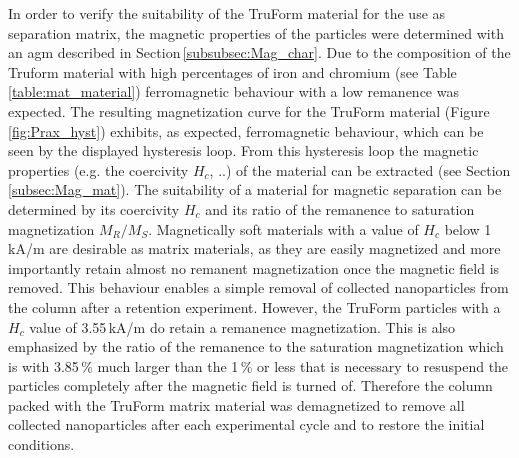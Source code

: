 In order to verify the suitability of the TruForm material for the use as separation matrix, the magnetic properties of the particles were determined with an \gls{agm} described in Section\,\ref{subsubsec:Mag_char}. Due to the composition of the Truform material with high percentages of iron and chromium (see Table\,\ref{table:mat_material}) ferromagnetic behaviour with a low remanence was expected. The resulting magnetization curve for the TruForm material (Figure\,\ref{fig:Prax_hyst}) exhibits, as expected, ferromagnetic behaviour, which can be seen by the displayed hysteresis loop. From this hysteresis loop the magnetic properties (e.g. the coercivity $H_{c}$, ..) of the material can be extracted (see Section \ref{subsec:Mag_mat}). The suitability of a material for magnetic separation can be determined by its coercivity $H_{c}$ and its ratio of the remanence to saturation magnetization $M_{R}/M_{S}$. Magnetically soft materials with a value of $H_{c}$ below 1\,kA/m are desirable as matrix materials, as they are easily magnetized and more importantly retain almost no remanent magnetization once the magnetic field is removed. This behaviour enables a simple removal of collected nanoparticles from the column after a retention experiment. However, the TruForm particles with a $H_{c}$ value of 3.55\,kA/m do retain a remanence magnetization. This is also emphasized by the ratio of the remanence to the saturation magnetization which is with 3.85\,\% much larger than the 1\,\% or less that is necessary to resuspend the particles completely after the magnetic field is turned of. Therefore the column packed with the TruForm matrix material was demagnetized to remove all collected nanoparticles after each experimental cycle and to restore the initial conditions. \FloatBarrier

